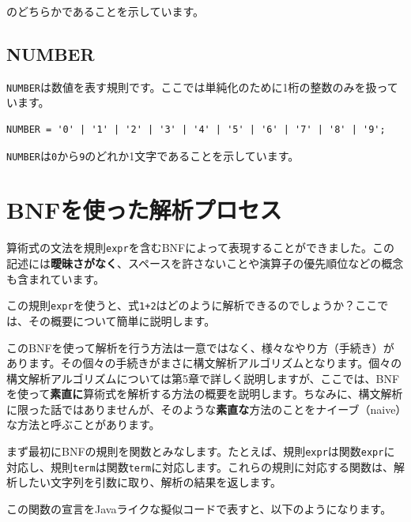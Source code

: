 のどちらかであることを示しています。

\hypertarget{chapter2-number}{%
\subsection{NUMBER}\label{chapter2-number}}

\texttt{NUMBER}は数値を表す規則です。ここでは単純化のために1桁の整数のみを扱っています。

\begin{verbatim}
NUMBER = '0' | '1' | '2' | '3' | '4' | '5' | '6' | '7' | '8' | '9';
\end{verbatim}

\texttt{NUMBER}は\texttt{0}から\texttt{9}のどれか1文字であることを示しています。

\hypertarget{chapter2-bnfux3092ux4f7fux3063ux305fux89e3ux6790ux30d7ux30edux30bbux30b9}{%
\section{BNFを使った解析プロセス}\label{chapter2-bnfux3092ux4f7fux3063ux305fux89e3ux6790ux30d7ux30edux30bbux30b9}}

算術式の文法を規則\texttt{expr}を含むBNFによって表現することができました。この記述には\textbf{曖昧さがなく}、スペースを許さないことや演算子の優先順位などの概念も含まれています。

この規則\texttt{expr}を使うと、式\texttt{1+2}はどのように解析できるのでしょうか？ここでは、その概要について簡単に説明します。

このBNFを使って解析を行う方法は一意ではなく、様々なやり方（手続き）があります。その個々の手続きがまさに構文解析アルゴリズムとなります。個々の構文解析アルゴリズムについては第5章で詳しく説明しますが、ここでは、BNFを使って\textbf{素直に}算術式を解析する方法の概要を説明します。ちなみに、構文解析に限った話ではありませんが、そのような\textbf{素直な}方法のことをナイーブ（naive）な方法と呼ぶことがあります。

まず最初にBNFの規則を関数とみなします。たとえば、規則\texttt{expr}は関数\texttt{expr}に対応し、規則\texttt{term}は関数\texttt{term}に対応します。これらの規則に対応する関数は、解析したい文字列を引数に取り、解析の結果を返します。

この関数の宣言をJavaライクな擬似コードで表すと、以下のようになります。

\begin{Shaded}
\begin{Highlighting}[]
\NormalTok{(}
\end{Highlighting}
\end{Shaded}

